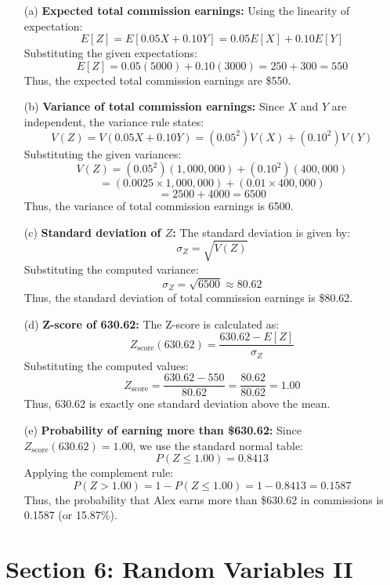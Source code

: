 \documentclass{article}
\begin{document}
\begin{enumerate}

    \item[(a)] \textbf{Expected total commission earnings:}
    Using the linearity of expectation:
    \[
    E[Z] = E[0.05X + 0.10Y] = 0.05E[X] + 0.10E[Y]
    \]
    Substituting the given expectations:
    \[
    E[Z] = 0.05(5000) + 0.10(3000) = 250 + 300 = 550
    \]
    Thus, the expected total commission earnings are \$550.

    \item[(b)] \textbf{Variance of total commission earnings:}
    Since \( X \) and \( Y \) are independent, the variance rule states:
    \[
    V(Z) = V(0.05X + 0.10Y) = (0.05^2)V(X) + (0.10^2)V(Y)
    \]
    Substituting the given variances:
    \[
    V(Z) = (0.05^2)(1,000,000) + (0.10^2)(400,000)
    \]
    \[
    = (0.0025 \times 1,000,000) + (0.01 \times 400,000)
    \]
    \[
    = 2500 + 4000 = 6500
    \]
    Thus, the variance of total commission earnings is 6500.

    \item[(c)] \textbf{Standard deviation of \( Z \):}
    The standard deviation is given by:
    \[
    \sigma_Z = \sqrt{V(Z)}
    \]
    Substituting the computed variance:
    \[
    \sigma_Z = \sqrt{6500} \approx 80.62
    \]
    Thus, the standard deviation of total commission earnings is \$80.62.

    \item[(d)] \textbf{Z-score of 630.62:}
    The Z-score is calculated as:
    \[
    Z_{\text{score}}(630.62) = \frac{630.62 - E[Z]}{\sigma_Z}
    \]
    Substituting the computed values:
    \[
    Z_{\text{score}} = \frac{630.62 - 550}{80.62} = \frac{80.62}{80.62} = 1.00
    \]
    Thus, 630.62 is exactly one standard deviation above the mean.

    \item[(e)] \textbf{Probability of earning more than \$630.62:}
    Since \( Z_{\text{score}}(630.62) = 1.00 \), we use the standard normal table:
    \[
    P(Z \leq 1.00) = 0.8413
    \]
    Applying the complement rule:
    \[
    P(Z > 1.00) = 1 - P(Z \leq 1.00) = 1 - 0.8413 = 0.1587
    \]
    Thus, the probability that Alex earns more than \$630.62 in commissions is 0.1587 (or 15.87\%).

\end{enumerate}

\section*{Section 6: Random Variables II}
\end{document}
